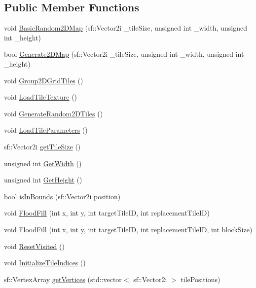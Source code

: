 \subsection*{Public Member Functions}
\begin{DoxyCompactItemize}
\item 
void \mbox{\hyperlink{class_map_a1fabae1bed7d63177af112101c38c3b5}{Basic\+Random2\+D\+Map}} (sf\+::\+Vector2i \+\_\+tile\+Size, unsigned int \+\_\+width, unsigned int \+\_\+height)
\item 
bool \mbox{\hyperlink{class_map_a6e7c6b33a4b312d325eb7079f651b414}{Generate2\+D\+Map}} (sf\+::\+Vector2i \+\_\+tile\+Size, unsigned int \+\_\+width, unsigned int \+\_\+height)
\item 
void \mbox{\hyperlink{class_map_af2b4481fa4588c8aa5ab6e8c45c5f7cf}{Group2\+D\+Grid\+Tiles}} ()
\item 
void \mbox{\hyperlink{class_map_ab64e7930cd811d847dbbee056b1e2fb0}{Load\+Tile\+Texture}} ()
\item 
void \mbox{\hyperlink{class_map_a9fe61ffc95d4fc4bed052ead1c06221a}{Generate\+Random2\+D\+Tiles}} ()
\item 
void \mbox{\hyperlink{class_map_a4e045e2e1df74c3fcba4b860f240d498}{Load\+Tile\+Parameters}} ()
\item 
sf\+::\+Vector2i \mbox{\hyperlink{class_map_a5070fd388ce6f5ab71dd63475e28302c}{get\+Tile\+Size}} ()
\item 
unsigned int \mbox{\hyperlink{class_map_a1e9263abe2e1290fc383586c327f9f4a}{Get\+Width}} ()
\item 
unsigned int \mbox{\hyperlink{class_map_a5181eaa96c1d125523a2b16d0643bbd5}{Get\+Height}} ()
\item 
bool \mbox{\hyperlink{class_map_aaf32aa299155bde102ea974acee38b3d}{is\+In\+Bounds}} (sf\+::\+Vector2i position)
\item 
void \mbox{\hyperlink{class_map_af2d39f9bcdfea3c79c3670f79fc7f548}{Flood\+Fill}} (int x, int y, int target\+Tile\+ID, int replacement\+Tile\+ID)
\item 
void \mbox{\hyperlink{class_map_adeb884ce208e7fca98bb7d6c86c4ace6}{Flood\+Fill}} (int x, int y, int target\+Tile\+ID, int replacement\+Tile\+ID, int block\+Size)
\item 
void \mbox{\hyperlink{class_map_a2b24578b19c64fd8bc94ab2f36ffb9fc}{Reset\+Visited}} ()
\item 
void \mbox{\hyperlink{class_map_a5227c01512d16adc154ee48b8967e14b}{Initialize\+Tile\+Indices}} ()
\item 
sf\+::\+Vertex\+Array \mbox{\hyperlink{class_map_ace55cfcebed9b27fd2329a16ce4ab352}{get\+Vertices}} (std\+::vector$<$ sf\+::\+Vector2i $>$ tile\+Positions)

\end{DoxyCompactItemize}
